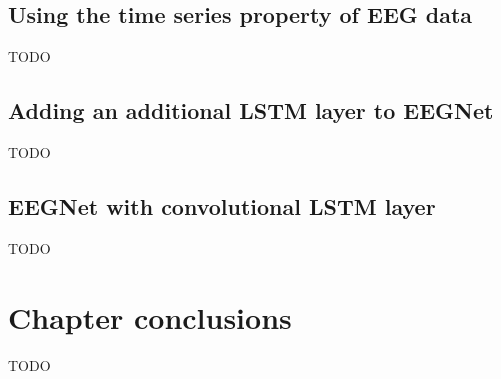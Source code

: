 
\subsection{Using the time series property of EEG data}
\label{subsec:offline_bci_system_adding_memory_time_series}

TODO


\subsection{Adding an additional LSTM layer to EEGNet}
\label{subsec:offline_bci_system_adding_memory_lstm_eegnet}

TODO


\subsection{EEGNet with convolutional LSTM layer}
\label{subsec:offline_bci_system_adding_memory_convlstm_eegnet}


TODO

\section{Chapter conclusions}
\label{sec:offline_bci_summary}

TODO